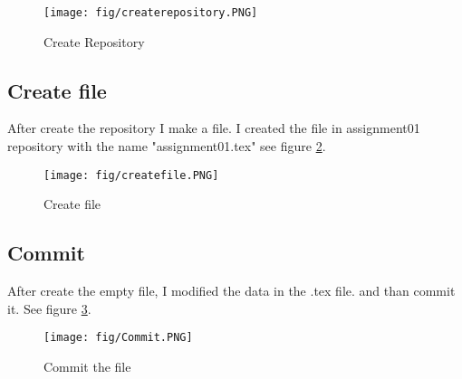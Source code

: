 \documentclass[paper=a4, fontsize=12pt]{scrartcl}
\numberwithin{equation}{section} %
\numberwithin{figure}{section} %
\numberwithin{table}{section} %
\begin{document}
\begin{figure}
\texttt{[image: fig/createrepository.PNG]}
\caption{Create Repository}
\label{crepo}
\end{figure}

\subsection{Create file}
After create the repository I make a file. I created the file in assignment01 repository with the name "assignment01.tex" see figure \ref{cfile}.

\begin{figure}
\texttt{[image: fig/createfile.PNG]}
\caption{Create file}
\label{cfile}
\end{figure}

\subsection{Commit}
After create the empty file, I modified the data in the .tex file. and than commit it. See figure \ref{ccom}.

\begin{figure}
\texttt{[image: fig/Commit.PNG]}
\caption{Commit the file}
\label{ccom}
\end{figure}





\end{document}

